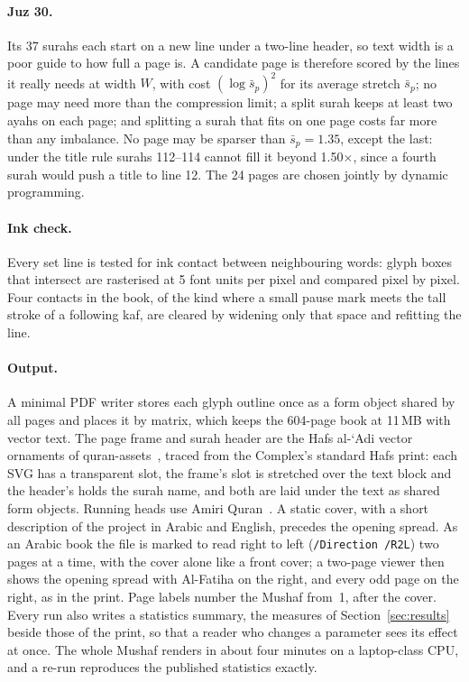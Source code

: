\documentclass[sigconf,nonacm]{acmart}
\newcommand{\x}{\ensuremath{\times}}
\begin{document}
\paragraph{Juz 30.} Its 37 surahs each start on a new line under a two-line header, so text width is a poor guide to how full a page is. A candidate page is therefore scored by the lines it really needs at width $W$, with cost $(\log \bar s_p)^2$ for its average stretch $\bar s_p$; no page may need more than the compression limit; a split surah keeps at least two ayahs on each page; and splitting a surah that fits on one page costs far more than any imbalance. No page may be sparser than $\bar s_p=1.35$, except the last: under the title rule surahs 112--114 cannot fill it beyond 1.50\x, since a fourth surah would push a title to line 12. The 24 pages are chosen jointly by dynamic programming.

\paragraph{Ink check.} Every set line is tested for ink contact between neighbouring words: glyph boxes that intersect are rasterised at 5 font units per pixel and compared pixel by pixel. Four contacts in the book, of the kind where a small pause mark meets the tall stroke of a following kaf, are cleared by widening only that space and refitting the line.

\paragraph{Output.} A minimal PDF writer stores each glyph outline once as a form object shared by all pages and places it by matrix, which keeps the 604-page book at 11\,MB with vector text. The page frame and surah header are the Hafs al-`Adi vector ornaments of quran-assets~\cite{quranassets}, traced from the Complex's standard Hafs print: each SVG has a transparent slot, the frame's slot is stretched over the text block and the header's holds the surah name, and both are laid under the text as shared form objects. Running heads use Amiri Quran~\cite{amiri}. A static cover, with a short description of the project in Arabic and English, precedes the opening spread. As an Arabic book the file is marked to read right to left (\texttt{/Direction /R2L}) two pages at a time, with the cover alone like a front cover; a two-page viewer then shows the opening spread with Al-Fatiha on the right, and every odd page on the right, as in the print. Page labels number the Mushaf from~1, after the cover. Every run also writes a statistics summary, the measures of Section~\ref{sec:results} beside those of the print, so that a reader who changes a parameter sees its effect at once. The whole Mushaf renders in about four minutes on a laptop-class CPU, and a re-run reproduces the published statistics exactly.
\end{document}
